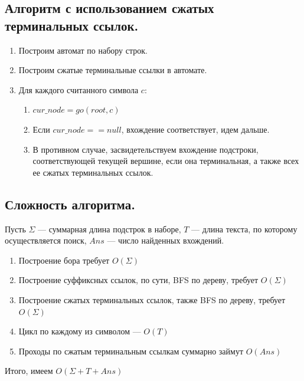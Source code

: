 \subsection{Алгоритм с использованием сжатых терминальных ссылок.}
\begin{enumerate}
    \item Построим автомат по набору строк.
    \item Построим сжатые терминальные ссылки в автомате.
    \item Для каждого считанного символа $c$:
        \begin{enumerate}
            \item $cur\_node = go(root, c)$
            \item Если $cur\_node == null$, вхождение соответствует, идем дальше.
            \item В противном случае, засвидетельствуем вхождение подстроки, соответствующей текущей вершине, если она терминальная, а также всех ее сжатых терминальных ссылок.
        \end{enumerate}
\end{enumerate}

\subsection{Сложность алгоритма.}
Пусть $\Sigma$ --- суммарная длина подстрок в наборе,  $T$ --- длина текста, по которому осуществляется поиск, $Ans$ --- число найденных вхождений.

\begin{enumerate}
    \item Построение бора требует $O(\Sigma)$
    \item Построение суффиксных ссылок, по сути, BFS по дереву, требует  $O(\Sigma)$
    \item Построение сжатых терминальных ссылок, также BFS по дереву, требует $O(\Sigma)$
    \item Цикл по каждому из символом --- $O(T)$
    \item Проходы по сжатым терминальным ссылкам суммарно займут  $O(Ans)$
\end{enumerate}

Итого, имеем $O(\Sigma + T + Ans)$
